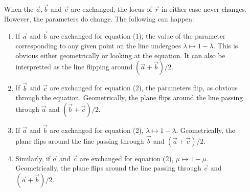 \documentclass[12pt]{article}
\begin{document}
\begin{answer}
        When the $\vec{a},\vec{b}$ and $\vec{c}$ are exchanged,
        the locus of $\vec{r}$ in either case never changes.
        However, the parameters do change.
        The following can happen:
        \begin{enumerate}[label=(\roman*)]
        \item If $\vec{a}$ and $\vec{b}$ are exchanged for equation (1),
            the value of the parameter corresponding to any given point
            on the line undergoes $\lambda \mapsto 1-\lambda$.
            This is obvious either geometrically or looking at the equation.
            It can also be interpretted as the line flipping
            around $(\vec{a}+\vec{b})/2$.
        \item If $\vec{b}$ and $\vec{c}$ are exchanged for equation (2),
            the parameters flip, as obvious through the equation.
            Geometrically, the plane flips around the line passing through
            $\vec{a}$ and $(\vec{b}+\vec{c})/2$.
        \item If $\vec{a}$ and $\vec{b}$ are exchanged for equation (2),
            $\lambda \mapsto 1-\lambda$.
            Geometrically, the plane flips around the line passing through
            $\vec{b}$ and $(\vec{a}+\vec{c})/2$.
        \item Similarly, if $\vec{a}$ and $\vec{c}$ are exchanged for equation (2),
            $\mu \mapsto 1-\mu$.
            Geometrically, the plane flips around the line passing through
            $\vec{c}$ and $(\vec{a}+\vec{b})/2$.
        \end{enumerate}
    \end{answer}
\end{document}
